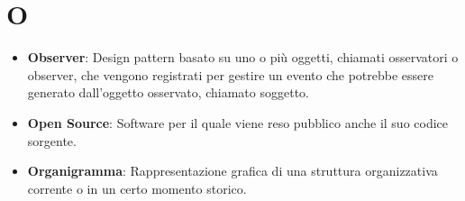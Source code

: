 \section*{O}
\begin{itemize}
	\item
	\textbf{Observer}: Design pattern basato su uno o più oggetti, chiamati osservatori o observer, che vengono registrati per gestire un evento che potrebbe essere generato dall'oggetto osservato, chiamato soggetto.
	\item
	\textbf{Open Source}: Software per il quale viene reso pubblico anche il suo codice sorgente.
	\item
	\textbf{Organigramma}: Rappresentazione grafica di una struttura organizzativa corrente o in un certo momento storico.
\end{itemize}
\newpage